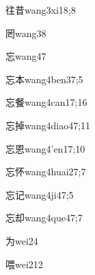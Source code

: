 \begin{verbete}{往昔}{wang3xi1}{8;8}
\end{verbete}

\begin{verbete}{罔}{wang3}{8}
\end{verbete}

\begin{verbete}{忘}{wang4}{7}
\end{verbete}

\begin{verbete}{忘本}{wang4ben3}{7;5}
\end{verbete}

\begin{verbete}{忘餐}{wang4can1}{7;16}
\end{verbete}

\begin{verbete}{忘掉}{wang4diao4}{7;11}
\end{verbete}

\begin{verbete}{忘恩}{wang4'en1}{7;10}
\end{verbete}

\begin{verbete}{忘怀}{wang4huai2}{7;7}
\end{verbete}

\begin{verbete}{忘记}{wang4ji4}{7;5}
\end{verbete}

\begin{verbete}{忘却}{wang4que4}{7;7}
\end{verbete}

\begin{verbete}{为}{wei2}{4}
\end{verbete}

\begin{verbete}{喂}{wei2}{12}
\end{verbete}

